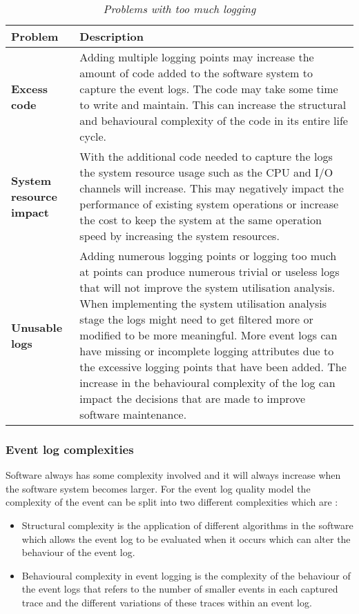 \begin{table}[!htb]
	\centering
	\caption[Problems with too much logging]
	{\textit{Problems with too much logging \cite{Zhu2015}}}
	\label{tbl:ch1_loggingTooMuch}
	\begin{tabularx}{\textwidth}{|l|X|}
		\hline \textbf{Problem}  & \textbf{Description} \\
		\hline \textbf{Excess code} & Adding multiple logging points may increase the amount of code added to the software system to capture the event logs. The code may take some time to write and maintain. This can increase the structural and behavioural complexity of the code in its entire life cycle. \\
		\hline \textbf{System resource impact} & With the additional code needed to capture the logs the system resource usage such as the CPU and I/O channels will increase. This may negatively impact the performance of existing system operations or increase the cost to keep the system at the same operation speed by increasing the system resources.\\
		\hline \textbf{Unusable logs} & Adding numerous logging points or logging too much at points can produce numerous trivial or useless logs that will not improve the system utilisation analysis. When implementing the system utilisation analysis stage the logs might need to get filtered more or modified to be more meaningful. More event logs can have missing or incomplete logging attributes due to the excessive logging points that have been added. The increase in the behavioural complexity of the log can impact the decisions that are made to improve software maintenance. \\
		\hline
	\end{tabularx}
\end{table}

\subsubsection{Event log complexities}
Software always has some complexity involved and it will always increase when the software system becomes larger. For the event log quality model the complexity of the event can be split into two different complexities which are \cite{Kherbouche2017}:

\begin{itemize}
	\item Structural complexity is the application of different algorithms in the software which allows the event log to be evaluated when it occurs which can alter the behaviour of the event log.
	\item Behavioural complexity in event logging is the complexity of the behaviour of the event logs that refers to the number of smaller events in each captured trace and the different variations of these traces within an event log.
\end{itemize}

